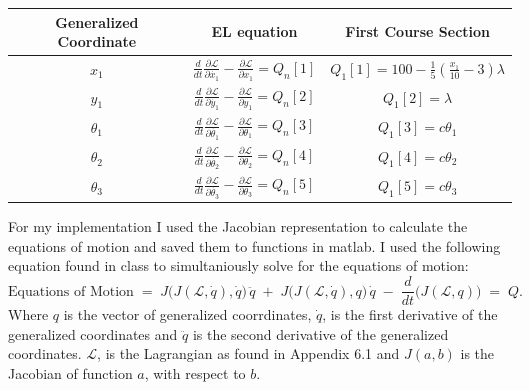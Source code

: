 \documentclass{article}
\begin{document}
\begin{center}
	\begin{tabular}{c|c|c}
		Generalized Coordinate & EL equation &First Course Section\\
		\hline
		$x_1$ & $\frac{d}{dt}\frac{\partial{\mathcal{L}}}{\partial{\dot{x_1}}}-\frac{\partial{\mathcal{L}}}{\partial{x_1}}=Q_n[1]$&$Q_1[1] = 100 - \frac{1}{5} \left( \frac{x_1}{10} - 3 \right) \lambda$\\
		$y_1$ & $\frac{d}{dt}\frac{\partial{\mathcal{L}}}{\partial{\dot{y_1}}}-\frac{\partial{\mathcal{L}}}{\partial{y_1}}=Q_n[2]$&$Q_1[2] = \lambda$\\
		$\theta_1$ & $\frac{d}{dt}\frac{\partial{\mathcal{L}}}{\partial{\dot{\theta_1}}}-\frac{\partial{\mathcal{L}}}{\partial{\theta_1}}=Q_n[3]$ & $Q_1[3] = c\theta_1$	\\		
		$\theta_2$ & $\frac{d}{dt}\frac{\partial{\mathcal{L}}}{\partial{\dot{\theta_2}}}-\frac{\partial{\mathcal{L}}}{\partial{\theta_2}}=Q_n[4]$& $Q_1[4] = c\theta_2$	\\
		$\theta_3$ & $\frac{d}{dt}\frac{\partial{\mathcal{L}}}{\partial{\dot{\theta_3}}}-\frac{\partial{\mathcal{L}}}{\partial{\theta_3}}=Q_n[5]$& $Q_1[5] = c\theta_3$	\\
	\end{tabular}
\end{center}
For my implementation I used the Jacobian representation to calculate the equations of motion and saved them to functions in matlab. I used the following equation found in class to simultaniously solve for the equations of motion:
\[
\text{Equations of Motion} \;=\; J\bigl(J(\mathcal{L},\dot{q}),\dot{q}\bigr)\,\ddot{q} 
\;+\; J\bigl(J(\mathcal{L},\dot{q}),q\bigr)\,\dot{q} 
\;-\; \frac{d}{dt}\bigl(J(\mathcal{L},q)\bigr) 
\;=\; Q.
\]
Where $q$ is the vector of generalized coorrdinates, $\dot{q}$, is the first derivative of the generalized coordinates and $\ddot{q}$ is the second derivative of the generalized coordinates. $\mathcal{L}$, is the Lagrangian as found in Appendix 6.1 and $J(a,b)$ is the Jacobian of function $a$, with respect to $b$.
\end{document}
